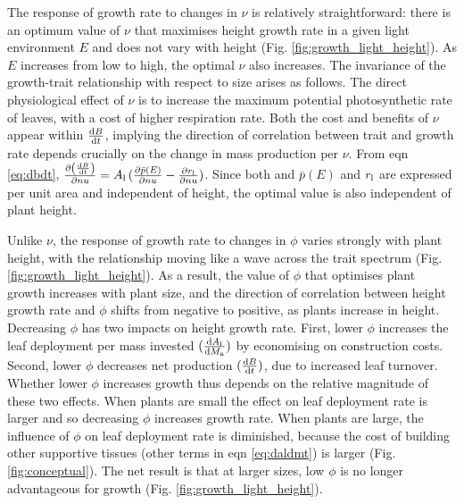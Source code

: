 \documentclass[a4paper,11pt]{article}
\begin{document}
 The response of growth rate to changes in $\nu$ is relatively straightforward: there is an optimum value of $\nu$ that maximises height growth rate in a given light environment $E$ and does not vary with height (Fig. \ref{fig:growth_light_height}). As $E$ increases from low to high, the optimal $\nu$ also increases. The invariance of the growth-trait relationship with respect to size arises as follows. The direct physiological effect of $\nu$ is to increase the maximum potential photosynthetic rate of leaves, with a cost of higher respiration rate. Both the cost and benefits of $\nu$ appear within $\frac{ {\rm d}B} {{\rm d}t}$, implying the direction of correlation between trait and growth rate depends crucially on the change in mass production per $\nu$.
From eqn \ref{eq:dbdt}, $\frac{\partial \left( \frac{ {\rm d}B} {{\rm d}t}\right)}{\partial nu} = A_{\rm l} \, (\frac{ \partial \bar{p}(E)}{\partial nu}  - \frac{ \partial r_{\rm l}}{\partial nu} )$. Since both and $\bar{p}(E)$ and $r_{\rm l}$ are expressed per unit area and independent of height, the optimal value is also independent of plant height.

Unlike $\nu$, the response of growth rate to changes in $\phi$ varies strongly with plant height, with the relationship moving like a wave across the trait spectrum (Fig. \ref{fig:growth_light_height}). As a result, the value of $\phi$ that optimises plant growth increases with plant size, and the direction of correlation between height growth rate and $\phi$ shifts from negative to positive, as plants increase in height. Decreasing $\phi$ has two impacts on height growth rate. First, lower $\phi$ increases the leaf deployment per mass invested $(\frac{{\rm d}A_{\rm l}}{{\rm d}M_{\rm a}})$ by economising on construction costs. Second, lower $\phi$ decreases net production $(\frac{{\rm d}B}{{\rm d}t})$, due to increased leaf turnover. Whether lower $\phi$ increases growth thus depends on the relative magnitude of these two effects. When plants are small the effect on leaf deployment rate is larger and so decreasing $\phi$ increases growth rate. When plants are large, the influence of $\phi$ on leaf deployment rate is diminished, because the cost of building other supportive tissues (other terms in eqn \ref{eq:daldmt}) is larger (Fig. \ref{fig:conceptual}). The net result is that at larger sizes, low $\phi$ is no longer advantageous for growth (Fig. \ref{fig:growth_light_height}).
\end{document}
